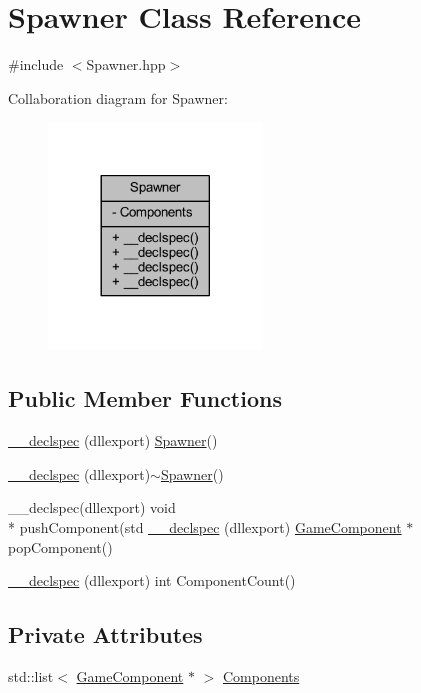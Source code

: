 \hypertarget{class_spawner}{\section{Spawner Class Reference}
\label{class_spawner}
}


{\ttfamily \#include $<$Spawner.\-hpp$>$}



Collaboration diagram for Spawner\-:\nopagebreak
\begin{figure}[H]
\begin{center}
\leavevmode
\includegraphics[width=161pt]{class_spawner__coll__graph}
\end{center}
\end{figure}
\subsection*{Public Member Functions}
\begin{DoxyCompactItemize}
\item 
\hyperlink{class_spawner_a2f9189658debef135e7ef3dae740dc60}{\-\_\-\-\_\-declspec} (dllexport) \hyperlink{class_spawner}{Spawner}()
\item 
\hyperlink{class_spawner_a7d9e09cf1588c58654650279268e02be}{\-\_\-\-\_\-declspec} (dllexport)$\sim$\hyperlink{class_spawner}{Spawner}()
\item 
\-\_\-\-\_\-declspec(dllexport) void \\*
push\-Component(std \hyperlink{class_spawner_ace0bb0cd4d53bd1ad8b6600f2b597bde}{\-\_\-\-\_\-declspec} (dllexport) \hyperlink{class_game_component}{Game\-Component} $\ast$pop\-Component()
\item 
\hyperlink{class_spawner_a593f6964eae5b1d47bbc82701d2aa0df}{\-\_\-\-\_\-declspec} (dllexport) int Component\-Count()
\end{DoxyCompactItemize}
\subsection*{Private Attributes}
\begin{DoxyCompactItemize}
\item 
std\-::list$<$ \hyperlink{class_game_component}{Game\-Component} $\ast$ $>$ \hyperlink{class_spawner_ae5e316957ac1574347ba80bac3866976}{Components}
\end{DoxyCompactItemize}


